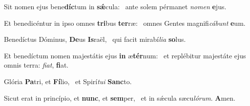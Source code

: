 \item Sit nomen ejus bene\textbf{díc}tum in \textbf{sǽ}cula:~\psstar{} ante solem pérmanet \textit{nomen} \textbf{e}jus.
\item Et benedicéntur in ipso omnes \textbf{tri}bus \textbf{ter}ræ:~\psstar{} omnes Gentes magnifi\textit{cábunt} \textbf{e}um.
\item Benedíctus Dóminus, \textbf{De}us \textbf{Is}raël,~\psstar{} qui facit mirabí\textit{lia} \textbf{so}lus.
\item Et benedíctum nomen majestátis ejus \textbf{in} æ\textbf{tér}num:~\psstar{} et replébitur majestáte ejus omnis terra: \textit{fiat}, \textbf{fi}at.
\item Glória \textbf{Pa}tri, et \textbf{Fí}lio,~\psstar{} et Spirí\textit{tui} \textbf{Sanc}to.
\item Sicut erat in princípio, et \textbf{nunc}, et \textbf{sem}per,~\psstar{} et in sǽcula sæcu\textit{lórum}. \textbf{A}men.